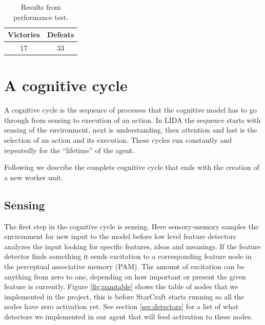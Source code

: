 \begin{table}
\begin{center}
\begin{tabular}{| c | c |}
  \hline
  Victories & Defeats\\
  \hline
  17 & 33 \\
  \hline
\end{tabular}
\caption{Results from performance test.}
\label{tab:test_results}
\end{center}
\end{table}

\section{A cognitive cycle}
\label{sec:cycle}
A cognitive cycle is the sequence of processes that the cognitive model has to go through from sensing to execution of an action. In LIDA the sequence starts with sensing of the environment, next is understanding, then attention and last is the selection of an action and its execution. These cycles run constantly and repeatedly for the ``lifetime'' of the agent.

Following we describe the complete cognitive cycle that ends with the creation of a new worker unit.

\subsection{Sensing}
The first step in the cognitive cycle is sensing. Here sensory-memory samples the environment for new input to the model before low level feature detectors analyzes the input looking for specific features, ideas and meanings. If the feature detector finds something it sends excitation to a corresponding feature node in the perceptual associative memory (PAM). The amount of excitation can be anything from zero to one, depending on how important or present the given feature is currently. Figure \ref{fig:pamtable} shows the table of nodes that we implemented in the project, this is before StarCraft starts running so all the nodes have zero activation yet. See section \ref{sec:detectors} for a list of what detectors we implemented in our agent that will feed activation to these nodes.

